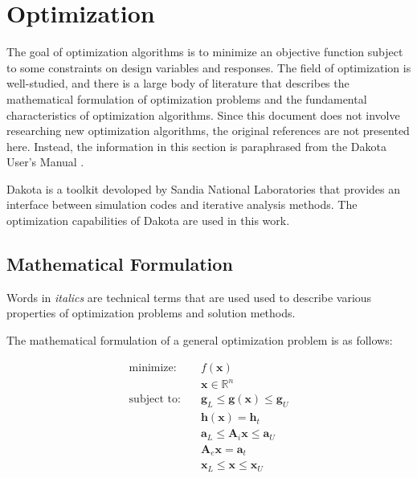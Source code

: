 \section{Optimization}
\label{sec:bg:opt}

The goal of optimization algorithms is to minimize an objective function subject to some constraints on design variables and responses.
The field of optimization is well-studied, and there is a large body of literature that describes the mathematical formulation of optimization problems and the fundamental characteristics of optimization algorithms.
Since this document does not involve researching new optimization algorithms, the original references are not presented here.
Instead, the information in this section is paraphrased from the Dakota User's Manual \cite{dakota}.

Dakota is a toolkit devoloped by Sandia National Laboratories that provides an interface between simulation codes and iterative analysis methods.
The optimization capabilities of Dakota are used in this work.

\subsection{Mathematical Formulation}
\label{sec:bg:opt:math}

Words in \textit{italics} are technical terms that are used used to describe various properties of optimization problems and solution methods.

The mathematical formulation of a general optimization problem is as follows:

\begin{equation}\begin{split}
  \mbox{minimize:}  \quad & f\left(\textbf{x}\right) \\
                          & \textbf{x} \in \mathbb{R}^n \\
  \mbox{subject to:}\quad & \textbf{g}_L \leq \textbf{g}\left(\textbf{x}\right) \leq \textbf{g}_U \\
                          & \textbf{h}\left(\textbf{x}\right) = \textbf{h}_t \\
                          & \textbf{a}_L \leq \textbf{A}_i\textbf{x} \leq \textbf{a}_U \\
                          & \textbf{A}_e\textbf{x} = \textbf{a}_t \\
                          & \textbf{x}_L \leq \textbf{x} \leq \textbf{x}_U
\end{split}\end{equation}

